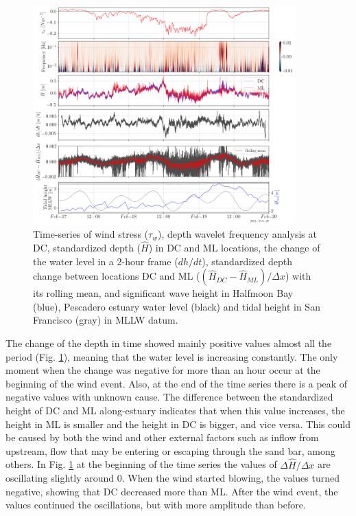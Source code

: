 \documentclass[tesis.tex]{subfiles}
\begin{document}
    \begin{figure}[h!]
      \centering
      \includegraphics[width=0.9\textwidth]{Imagenes/surf2.png}
      \caption{Time-series of wind stress ($\tau_w$), depth wavelet frequency analysis at DC, standardized depth ($\hat{H}$) in DC and ML locations, the change of the water level in a 2-hour frame ($dh/dt$), standardized depth change between locations DC and ML ($(\hat{H}_{DC}-\hat{H}_{ML})/\Delta x$) with its rolling mean, and significant wave height in Halfmoon Bay (blue), Pescadero estuary water level (black) and tidal height in San Francisco (gray) in MLLW datum.}
      \label{fig:surf2}
    \end{figure}
    
    The change of the depth in time showed mainly positive values almost all the period (Fig. \ref{fig:surf2}), meaning that the water level is increasing constantly. The only moment when the change was negative for more than an hour occur at the beginning of the wind event. Also, at the end of the time series there is a peak of negative values with unknown cause. The difference between the standardized height of DC and ML along-estuary indicates that when this value increases, the height in ML is smaller and the height in DC is bigger, and vice versa. This could be caused by both the wind and other external factors such as inflow from upstream, flow that may be entering or escaping through the sand bar, among others. In Fig. \ref{fig:surf2} at the beginning of the time series the values of $\Delta \hat{H}/\Delta x$ are oscillating slightly around 0. When the wind started blowing, the values turned negative, showing that DC decreased more than ML. After the wind event, the values continued the oscillations, but with more amplitude than before.\\
    
\end{document}
